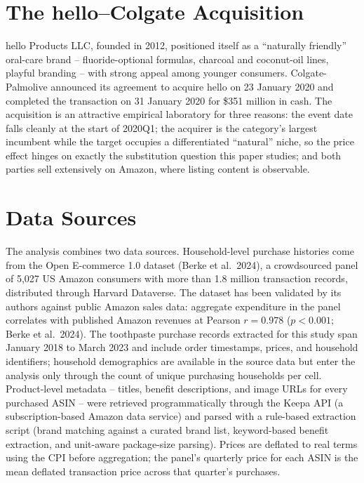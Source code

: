 \section{The hello--Colgate
Acquisition}\label{the-hellocolgate-acquisition}

hello Products LLC, founded in 2012, positioned itself as a ``naturally
friendly'' oral-care brand -- fluoride-optional formulas, charcoal and
coconut-oil lines, playful branding -- with strong appeal among younger
consumers. Colgate-Palmolive announced its agreement to acquire hello on
23 January 2020 and completed the transaction on 31 January 2020 for
\$351 million in cash. The acquisition is an attractive empirical
laboratory for three reasons: the event date falls cleanly at the start
of 2020Q1; the acquirer is the category's largest incumbent while the
target occupies a differentiated ``natural'' niche, so the price effect
hinges on exactly the substitution question this paper studies; and both
parties sell extensively on Amazon, where listing content is observable.

\section{Data Sources}\label{data-sources}

The analysis combines two data sources. Household-level purchase
histories come from the Open E-commerce 1.0 dataset (Berke et al.~2024),
a crowdsourced panel of 5,027 US Amazon consumers with more than 1.8
million transaction records, distributed through Harvard Dataverse. The
dataset has been validated by its authors against public Amazon sales
data: aggregate expenditure in the panel correlates with published
Amazon revenues at Pearson \(r = 0.978\) (\(p < 0.001\); Berke et
al.~2024). The toothpaste purchase records extracted for this study span
January 2018 to March 2023 and include order timestamps, prices, and
household identifiers; household demographics are available in the
source data but enter the analysis only through the count of unique
purchasing households per cell. Product-level metadata -- titles,
benefit descriptions, and image URLs for every purchased ASIN -- were
retrieved programmatically through the Keepa API (a subscription-based
Amazon data service) and parsed with a rule-based extraction script
(brand matching against a curated brand list, keyword-based benefit
extraction, and unit-aware package-size parsing). Prices are deflated to
real terms using the CPI before aggregation; the panel's quarterly price
for each ASIN is the mean deflated transaction price across that
quarter's purchases.

